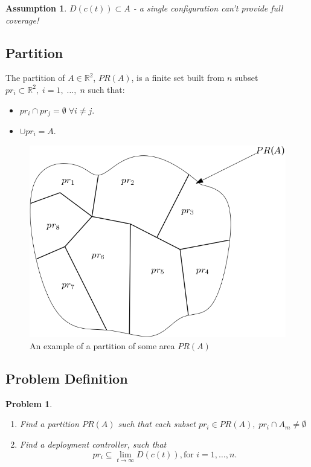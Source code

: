 \documentclass{iacas}
\newcommand{\rsqr}{\mathbb{R}^2}
\newtheorem{assumption}{Assumption}
\newtheorem{problem}{Problem}
\begin{document}
\begin{assumption}
$D\left( c\left( t \right) \right) \subset A$ - a single configuration \emph{can't} provide full coverage!
\end{assumption}

\subsection{Partition}
The partition of $A \in \rsqr$, $PR(A)$, is a finite set built from $n$ subset $pr_i \subset \rsqr,\; i=1,\; \ldots,\; n$ such that:
\begin{itemize}
\item $pr_i \cap pr_j = \emptyset \; \forall i \neq j$.
\item $\cup pr_i = A$.
\end{itemize}

\begin{figure}[!ht]
\centering
\includegraphics[scale=0.6]{figures/problem-def/partitioning.png}
\caption{An example of a partition of some area $PR(A)$}
\end{figure}

\subsection{Problem Definition}
\begin{problem} \label{GeneralProblem}
\begin{enumerate}
\item Find a partition $PR(A)$ such that each subset $pr_i \in PR(A), \; pr_i \cap A_m \neq \emptyset$
\item Find a deployment controller, such that $$ pr_i \subseteq \lim_{t\rightarrow \infty}D(c(t)),\text{for }i=1,\ldots,n.$$
\end{enumerate}
\end{problem}
\end{document}
